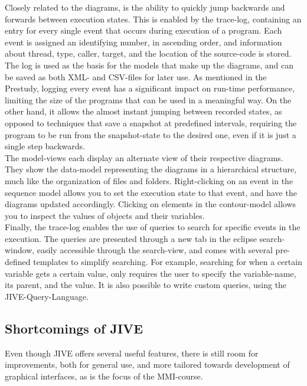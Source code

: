 Closely related to the diagrams, is the ability to quickly jump backwards and forwards between execution states.
This is enabled by the trace-log, containing an entry for every single event that occurs during execution of a program.
Each event is assigned an identifying number, in ascending order, and information about thread, type, caller, target, and the location of the source-code is stored.
The log is used as the basis for the models that make up the diagrams, and can be saved as both XML- and CSV-files for later use.
As mentioned in the Prestudy, logging every event has a significant impact on run-time performance, limiting the size of the programs that can be used in a meaningful way.
On the other hand, it allows the almost instant jumping between recorded states, as opposed to techniques that save a snapshot at predefined intervals, requiring the program to be run from the snapshot-state to the desired one, even if it is just a single step backwards.
~\\

The model-views each display an alternate view of their respective diagrams.%
They show the data-model representing the diagrams in a hierarchical structure, much like the organization of files and folders.
Right-clicking on an event in the sequence model allows you to set the execution state to that event, and have the diagrams updated accordingly.
Clicking on elements in the contour-model allows you to inspect the values of objects and their variables.
~\\

Finally, the trace-log enables the use of queries to search for specific events in the execution.
The queries are presented through a new tab in the eclipse search-window, easily accessible through the search-view, and comes with several pre-defined templates to simplify searching.
For example, searching for when a certain variable gets a certain value, only requires the user to specify the variable-name, its parent, and the value.
It is also possible to write custom queries, using the JIVE-Query-Language.
~\\

\subsection{Shortcomings of JIVE}\label{jiveShortcomings}

Even though JIVE offers several useful features, there is still room for improvements, both for general use, and more tailored towards development of graphical interfaces, as is the focus of the MMI-course.
~\\

